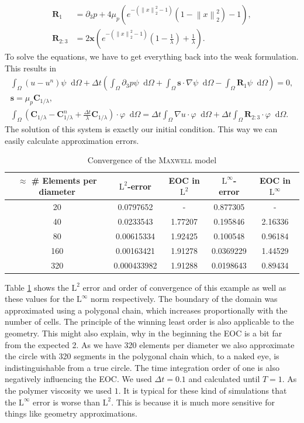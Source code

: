 \documentclass[12pt,a4paper,twoside, open=right]{scrreprt}
\theoremstyle{definition}
\theoremstyle{plain}
\newcommand{\norm}[1]{\left\lVert#1\right\rVert}
\newcommand{\bfs}{\bm{s}}
\newcommand{\bfC}{\bm{C}}
\newcommand{\bfx}{\bm{x}}
\newcommand{\bfR}{\bm{R}}
\newcommand{\D}{\mathop{}\!\mathrm{d}}
\begin{document}
\begin{align}
   \bfR_1 &= \partial_3 p +4\mu_p(e^{-(\norm{x}_2^2 -1)}(1-\norm{x}_2^2)-1),\\
   \bfR_{2:3} &=2\bfx\left(e^{-(\norm{x}_2^2 -1)}\left(1-\frac{1}{\lambda}\right)+\frac{1}{\lambda}\right).
\end{align}
To solve the equations, we have to get everything back into the weak formulation. This results in 
\begin{align}
\int_\Omega(u-u^n)\psi\D\Omega +\Delta t\left(\int_\Omega\partial_3 p\psi\D\Omega + \int_\Omega\bfs\cdot\nabla\psi\D\Omega-\int_\Omega \bfR_1\psi\D\Omega\right) = 0,\\
\bfs =\mu_p\bfC_{1/\lambda},\\
\int_\Omega(\bfC_{1/\lambda} - \bfC_{1/\lambda}^n +\frac{\Delta t}{\lambda}\bfC_{1/\lambda})\cdot\varphi\D\Omega = 
\Delta t\int_\Omega \nabla u\cdot\varphi\D\Omega+\Delta t\int_{\Omega}\bfR_{2:3}\cdot\varphi\D\Omega.
\end{align}
The solution of this system is exactly our initial condition. This way we can easily calculate approximation errors. 
\begin{table}
    \centering
    \begin{tabular}{c|c|c|c|c}
        $\approx$ \# Elements per diameter& $\mathrm{L}^2$-error&EOC in $\mathrm{L}^2$&$\mathrm{L}^\infty$-error &EOC in $\mathrm{L}^\infty$\\
        \hline
        20 & 0.0797652 & - & 0.877305 & -\\
        40 & 0.0233543 & 1.77207 & 0.195846 & 2.16336\\
        80 & 0.00615334 & 1.92425 & 0.100548 & 0.96184\\
        160 & 0.00163421 & 1.91278 & 0.0369229 & 1.44529\\
        320 & 0.000433982 & 1.91288 & 0.0198643 & 0.89434
    \end{tabular}
\caption{Convergence of the \textsc{Maxwell} model}
\label{tab:maxwellconv}
\end{table}

Table \ref{tab:maxwellconv} shows the $\mathrm{L}^2$ error and order of convergence of this example as well as these values for the $\mathrm{L}^\infty$ norm respectively. The boundary of the domain was approximated using a polygonal chain, which increases proportionally with the number of cells. The principle of the winning least order is also applicable to the geometry. This might also explain, why in the beginning the EOC is a bit far from the expected 2. As we have 320 elements per diameter we also approximate the circle with 320 segments in the polygonal chain which, to a naked eye, is indistinguishable from a true circle. The time integration order of one is also negatively influencing the EOC. We used $\Delta t = 0.1$ and calculated until $T=1$. As the polymer viscosity we used $1$. It is typical for these kind of simulations that the $\mathrm{L}^\infty$ error is worse than $\mathrm{L}^2$. This is because it is much more sensitive for things like geometry approximations.
\end{document}

